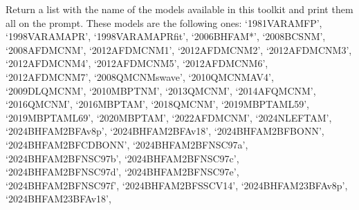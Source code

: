 \documentclass[letterpaper,10pt,english]{sphinxmanual}
\begin{document}

\begin{fulllineitems}
\label{\detokenize{source/api/setup_eos_micro:nucleardatapy.setup_eos_micro.eos_micro_models}}
\pysigstartsignatures
\pysiglinewithargsret
{}
{}
{}
\pysigstopsignatures
\sphinxAtStartPar
Return a list with the name of the models available in this toolkit and     print them all on the prompt. These models are the following ones:     ‘1981\sphinxhyphen{}VAR\sphinxhyphen{}AM\sphinxhyphen{}FP’, ‘1998\sphinxhyphen{}VAR\sphinxhyphen{}AM\sphinxhyphen{}APR’, ‘1998\sphinxhyphen{}VAR\sphinxhyphen{}AM\sphinxhyphen{}APRfit’, ‘2006\sphinxhyphen{}BHF\sphinxhyphen{}AM*’, ‘2008\sphinxhyphen{}BCS\sphinxhyphen{}NM’, ‘2008\sphinxhyphen{}AFDMC\sphinxhyphen{}NM’,     ‘2012\sphinxhyphen{}AFDMC\sphinxhyphen{}NM\sphinxhyphen{}1’, ‘2012\sphinxhyphen{}AFDMC\sphinxhyphen{}NM\sphinxhyphen{}2’, ‘2012\sphinxhyphen{}AFDMC\sphinxhyphen{}NM\sphinxhyphen{}3’, ‘2012\sphinxhyphen{}AFDMC\sphinxhyphen{}NM\sphinxhyphen{}4’,     ‘2012\sphinxhyphen{}AFDMC\sphinxhyphen{}NM\sphinxhyphen{}5’, ‘2012\sphinxhyphen{}AFDMC\sphinxhyphen{}NM\sphinxhyphen{}6’, ‘2012\sphinxhyphen{}AFDMC\sphinxhyphen{}NM\sphinxhyphen{}7’,     ‘2008\sphinxhyphen{}QMC\sphinxhyphen{}NM\sphinxhyphen{}swave’, ‘2010\sphinxhyphen{}QMC\sphinxhyphen{}NM\sphinxhyphen{}AV4’, ‘2009\sphinxhyphen{}DLQMC\sphinxhyphen{}NM’, ‘2010\sphinxhyphen{}MBPT\sphinxhyphen{}NM’,     ‘2013\sphinxhyphen{}QMC\sphinxhyphen{}NM’, ‘2014\sphinxhyphen{}AFQMC\sphinxhyphen{}NM’, ‘2016\sphinxhyphen{}QMC\sphinxhyphen{}NM’, ‘2016\sphinxhyphen{}MBPT\sphinxhyphen{}AM’,     ‘2018\sphinxhyphen{}QMC\sphinxhyphen{}NM’, ‘2019\sphinxhyphen{}MBPT\sphinxhyphen{}AM\sphinxhyphen{}L59’, ‘2019\sphinxhyphen{}MBPT\sphinxhyphen{}AM\sphinxhyphen{}L69’,     ‘2020\sphinxhyphen{}MBPT\sphinxhyphen{}AM’, ‘2022\sphinxhyphen{}AFDMC\sphinxhyphen{}NM’, ‘2024\sphinxhyphen{}NLEFT\sphinxhyphen{}AM’,     ‘2024\sphinxhyphen{}BHF\sphinxhyphen{}AM\sphinxhyphen{}2BF\sphinxhyphen{}Av8p’, ‘2024\sphinxhyphen{}BHF\sphinxhyphen{}AM\sphinxhyphen{}2BF\sphinxhyphen{}Av18’, ‘2024\sphinxhyphen{}BHF\sphinxhyphen{}AM\sphinxhyphen{}2BF\sphinxhyphen{}BONN’, ‘2024\sphinxhyphen{}BHF\sphinxhyphen{}AM\sphinxhyphen{}2BF\sphinxhyphen{}CDBONN’,     ‘2024\sphinxhyphen{}BHF\sphinxhyphen{}AM\sphinxhyphen{}2BF\sphinxhyphen{}NSC97a’, ‘2024\sphinxhyphen{}BHF\sphinxhyphen{}AM\sphinxhyphen{}2BF\sphinxhyphen{}NSC97b’, ‘2024\sphinxhyphen{}BHF\sphinxhyphen{}AM\sphinxhyphen{}2BF\sphinxhyphen{}NSC97c’, ‘2024\sphinxhyphen{}BHF\sphinxhyphen{}AM\sphinxhyphen{}2BF\sphinxhyphen{}NSC97d’,     ‘2024\sphinxhyphen{}BHF\sphinxhyphen{}AM\sphinxhyphen{}2BF\sphinxhyphen{}NSC97e’, ‘2024\sphinxhyphen{}BHF\sphinxhyphen{}AM\sphinxhyphen{}2BF\sphinxhyphen{}NSC97f’, ‘2024\sphinxhyphen{}BHF\sphinxhyphen{}AM\sphinxhyphen{}2BF\sphinxhyphen{}SSCV14’,    ‘2024\sphinxhyphen{}BHF\sphinxhyphen{}AM\sphinxhyphen{}23BF\sphinxhyphen{}Av8p’, ‘2024\sphinxhyphen{}BHF\sphinxhyphen{}AM\sphinxhyphen{}23BF\sphinxhyphen{}Av18’, 
\end{fulllineitems}
\end{document}
